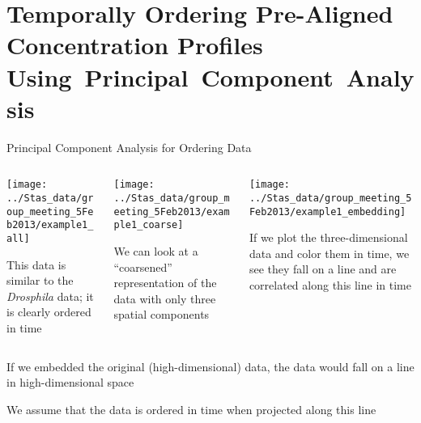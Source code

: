 \section[Concentration Profiles and Principal Component Analysis]{Temporally Ordering Pre-Aligned Concentration Profiles Using~Principal~Component~Analysis}

\begin{frame}{Principal Component Analysis for Ordering Data}

    \begin{columns}[T]
        \begin{column}{0.3 \textwidth}
            \texttt{[image: ../Stas\_data/group\_meeting\_5Feb2013/example1\_all]}

            {\scriptsize This data is similar to the {\em Drosphila} data; it is clearly ordered in time \par}
        \end{column}

        \begin{column}{0.3 \textwidth}
            \texttt{[image: ../Stas\_data/group\_meeting\_5Feb2013/example1\_coarse]}

            {\scriptsize We can look at a ``coarsened'' representation of the data with only three spatial components \par}
        \end{column}

        \begin{column}{0.3 \textwidth}
            \texttt{[image: ../Stas\_data/group\_meeting\_5Feb2013/example1\_embedding]}

            {\scriptsize If we plot the three-dimensional data and color them in time, we see they fall on a line and are correlated along this line in time \par}
        \end{column}
    \end{columns}

	\begin{columns}
	\begin{column}{0.7\textwidth}
	\begin{itemize}
	{\small   
   \item If we embedded the original (high-dimensional) data, the data would fall on a line in high-dimensional space

   \item We assume that the data is ordered in time when projected along this line
   
}
\end{itemize}
\end{column}
\end{columns}
\end{frame}
